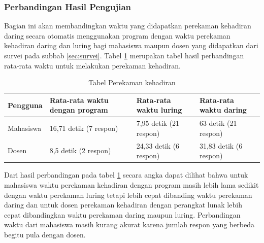 \subsubsection{Perbandingan Hasil Pengujian}
Bagian ini akan membandingkan waktu yang didapatkan perekaman kehadiran daring secara otomatis menggunakan program dengan waktu perekaman kehadiran daring dan luring bagi mahasiswa maupun dosen yang didapatkan dari survei pada subbab \ref{sec:survei}. Tabel \ref{tab:banding} merupakan tabel hasil perbandingan rata-rata waktu untuk melakukan perekaman kehadiran.
\begin{table}[H]			
 	\caption{Tabel Perekaman kehadiran}
 	\centering
 	\begin{tabular}{|p{2cm} |p{4cm} |p{4cm}| p{4cm}|} \hline
 		Pengguna & Rata-rata waktu dengan program & Rata-rata waktu luring & Rata-rata waktu daring\\ \hline     
 		Mahasiswa & 16,71 detik (7 respon)& 7,95 detik (21 respon)& 63 detik (21 respon)\\ \hline 
 		Dosen & 8,5 detik (2 respon)&  24,33 detik (6 respon)& 31,83 detik (6 respon)\\ \hline 
 	\end{tabular}
 	\label{tab:banding} 
\end{table}
Dari hasil perbandingan pada tabel \ref{tab:banding} secara angka dapat dilihat bahwa untuk mahasiswa waktu perekaman kehadiran dengan program masih lebih lama sedikit dengan waktu perekaman luring tetapi lebih cepat dibanding waktu perekaman daring dan untuk dosen perekaman kehadiran dengan perangkat lunak lebih cepat dibandingkan waktu perekaman daring maupun luring. Perbandingan waktu dari mahasiswa masih kurang akurat karena jumlah respon yang berbeda begitu pula dengan dosen.
